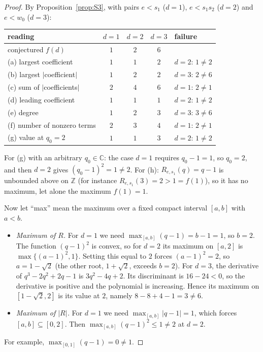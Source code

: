 \documentclass[11pt]{article}
\theoremstyle{remark}
\begin{document}
\begin{proof}
By Proposition~\ref{prop:S3}, with pairs $e<s_1$ ($d=1$), $e<s_1s_2$ ($d=2$) and
$e<w_0$ ($d=3$):

\begin{center}
\begin{tabular}{lcccl}
\toprule
reading & $d=1$ & $d=2$ & $d=3$ & failure\\
\midrule
conjectured $f(d)$ & $1$ & $2$ & $6$ & \\
(a) largest coefficient & $1$ & $1$ & $2$ & $d=2$: $1\ne2$\\
(b) largest $|$coefficient$|$ & $1$ & $2$ & $2$ & $d=3$: $2\ne6$\\
(c) sum of $|$coefficients$|$ & $2$ & $4$ & $6$ & $d=1$: $2\ne1$\\
(d) leading coefficient & $1$ & $1$ & $1$ & $d=2$: $1\ne2$\\
(e) degree & $1$ & $2$ & $3$ & $d=3$: $3\ne6$\\
(f) number of nonzero terms & $2$ & $3$ & $4$ & $d=1$: $2\ne1$\\
(g) value at $q_0=2$ & $1$ & $1$ & $3$ & $d=2$: $1\ne2$\\
\bottomrule
\end{tabular}
\end{center}

For (g) with an arbitrary $q_0\in\mathbb C$: the case $d=1$ requires $q_0-1=1$, so
$q_0=2$, and then $d=2$ gives $(q_0-1)^2=1\ne2$. For (h): $R_{e,s_1}(q)=q-1$ is
unbounded above on $\mathbb Z$ (for instance $R_{e,s_1}(3)=2>1=f(1)$), so it has no
maximum, let alone the maximum $f(1)=1$.

Now let ``max'' mean the maximum over a fixed compact interval $[a,b]$ with
$a<b$.
\begin{itemize}
\item \emph{Maximum of $R$.} For $d=1$ we need $\max_{[a,b]}(q-1)=b-1=1$, so $b=2$.
The function $(q-1)^2$ is convex, so for $d=2$ its maximum on $[a,2]$ is
$\max\{(a-1)^2,1\}$. Setting this equal to $2$ forces $(a-1)^2=2$, so
$a=1-\sqrt2$ (the other root, $1+\sqrt2$, exceeds $b=2$). For $d=3$, the
derivative of $q^3-2q^2+2q-1$ is $3q^2-4q+2$. Its discriminant is
$16-24<0$, so the derivative is positive and the polynomial is increasing.
Hence its maximum on $[1-\sqrt2,2]$ is its value at $2$, namely $8-8+4-1=3\ne6$.
\item \emph{Maximum of $|R|$.} For $d=1$ we need $\max_{[a,b]}|q-1|=1$, which
forces $[a,b]\subseteq[0,2]$. Then $\max_{[a,b]}(q-1)^2\le1\ne2$ at $d=2$.
\end{itemize}
For example, $\max_{[0,1]}(q-1)=0\ne1$.
\end{proof}
\end{document}
